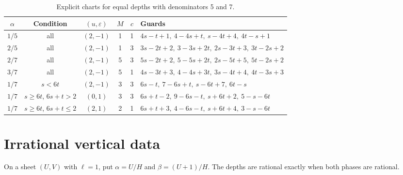\documentclass[11pt]{article}
\theoremstyle{remark}
\begin{document}
\begin{table}[ht]
\centering
\small
\begin{tabular}{cccccl}
\hline
$\alpha$ & Condition & $(u,\varepsilon)$ & $M$ & $c$ & Guards\\
\hline
$1/5$ & all & $(2,-1)$ & 1 & 1 & $4s-t+1,\ 4-4s+t,\ s-4t+4,\ 4t-s+1$\\
$2/5$ & all & $(2,-1)$ & 1 & 3 & $3s-2t+2,\ 3-3s+2t,\ 2s-3t+3,\ 3t-2s+2$\\
$2/7$ & all & $(2,-1)$ & 5 & 3 & $5s-2t+2,\ 5-5s+2t,\ 2s-5t+5,\ 5t-2s+2$\\
$3/7$ & all & $(2,-1)$ & 5 & 1 & $4s-3t+3,\ 4-4s+3t,\ 3s-4t+4,\ 4t-3s+3$\\
$1/7$ & $s<6t$ & $(2,-1)$ & 3 & 3 & $6s-t,\ 7-6s+t,\ s-6t+7,\ 6t-s$\\
$1/7$ & $s\ge6t$, $6s+t>2$ & $(0,1)$ & 3 & 3 & $6s+t-2,\ 9-6s-t,\ s+6t+2,\ 5-s-6t$\\
$1/7$ & $s\ge6t$, $6s+t\le2$ & $(2,1)$ & 2 & 1 & $6s+t+3,\ 4-6s-t,\ s+6t+4,\ 3-s-6t$\\
\hline
\end{tabular}
\caption{Explicit charts for equal depths with denominators 5 and 7.}
\label{tab:small}
\end{table}

\section{Irrational vertical data}\label{sec:irrational}
On a sheet $(U,V)$ with $\ell=1$, put $\alpha=U/H$ and $\beta=(U+1)/H$. The depths are rational exactly when both phases are rational.
\end{document}
